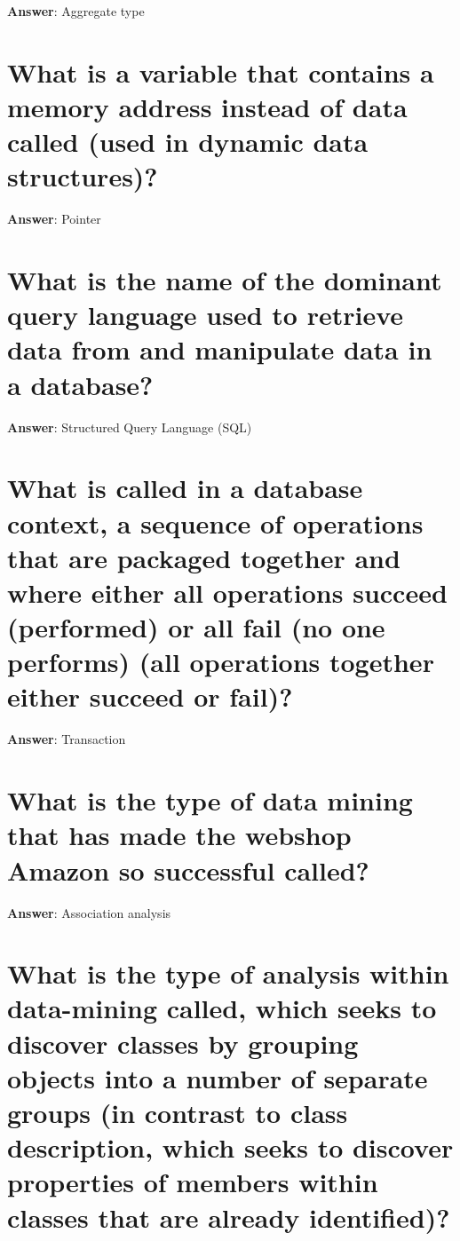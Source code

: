 \documentclass[a4paper,11pt,oneside]{book}
\begin{document}
\begin{sloppypar}
\label{q:52:sa:en:True}

\textbf{Answer}: Aggregate type



\section{What is a variable that contains a memory address instead of data called (used in dynamic data structures)?}

\label{q:53:sa:en:True}

\textbf{Answer}: Pointer



\section{What is the name of the dominant query language used to retrieve data from and manipulate data in a database?}

\label{q:54:sa:en:True}

\textbf{Answer}: Structured Query Language (SQL)



\section{What is called in a database context, a sequence of operations that are packaged together and where either all operations succeed (performed) or all fail (no one performs) (all operations together either succeed or fail)?}

\label{q:55:sa:en:True}

\textbf{Answer}: Transaction



\section{What is the type of data mining that has made the webshop Amazon so successful called?}

\label{q:56:sa:en:True}

\textbf{Answer}: Association analysis



\section{What is the type of analysis within data-mining called, which seeks to discover classes by grouping objects into a number of separate groups (in contrast to class description, which seeks to discover properties of members within classes that are already identified)?}


\end{sloppypar}
\end{document}
